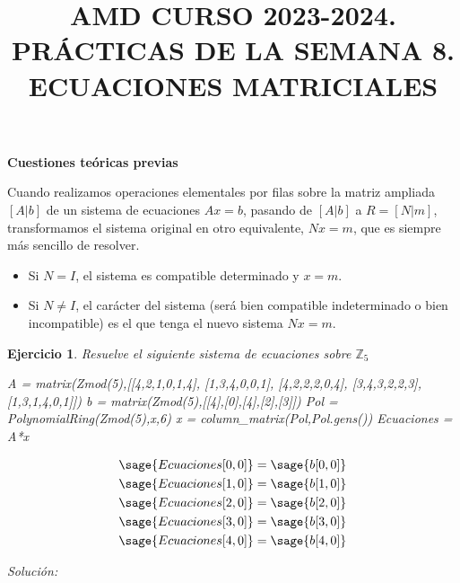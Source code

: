\documentclass{amsart}
\title{AMD CURSO 2023-2024. PRÁCTICAS DE LA SEMANA 8. ECUACIONES MATRICIALES}
\newtheorem{ejer}{Ejercicio}
\begin{document}
\maketitle

\begin{tcolorbox}[colback = orange!120!white]
{\bf Cuestiones teóricas previas}
\end{tcolorbox}

\begin{tcolorbox}[colback = orange!60!white]
Cuando realizamos operaciones elementales por filas sobre la matriz ampliada $[A|b]$ de un sistema de ecuaciones $Ax=b$, pasando de $[A|b]$ a $R=[N|m]$, transformamos el sistema original en otro equivalente, $Nx=m$, que es siempre más sencillo de resolver. 
\begin{itemize}
\item Si $N=I$, el sistema es compatible determinado y $x=m$. 
\item Si $N\not=I$, el carácter del sistema (será bien compatible indeterminado o bien incompatible) es el que tenga el nuevo sistema $Nx=m$.
\end{itemize}
\end{tcolorbox}

\begin{ejer} Resuelve el siguiente sistema de ecuaciones sobre ${\mathbb Z}_5$
\begin{sageblock}
A = matrix(Zmod(5),[[4,2,1,0,1,4],
[1,3,4,0,0,1],
[4,2,2,2,0,4],
[3,4,3,2,2,3],
[1,3,1,4,0,1]])
b = matrix(Zmod(5),[[4],[0],[4],[2],[3]])
Pol = PolynomialRing(Zmod(5),x,6)
x = column_matrix(Pol,Pol.gens())
Ecuaciones = A*x
\end{sageblock}
\begin{align*}
\sage{Ecuaciones[0,0]} &= \sage{b[0,0]} \\
\sage{Ecuaciones[1,0]} &= \sage{b[1,0]} \\
\sage{Ecuaciones[2,0]} &= \sage{b[2,0]} \\
\sage{Ecuaciones[3,0]} &= \sage{b[3,0]} \\
\sage{Ecuaciones[4,0]} &= \sage{b[4,0]} \\
\end{align*}
\end{ejer}

{\it Solución:}
\end{document}
